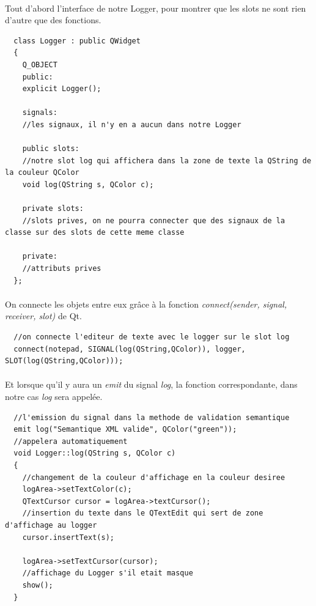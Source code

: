 \paragraph{}
Tout d'abord l'interface de notre Logger, pour montrer que les slots ne sont rien d'autre que des fonctions.
\begin{lstlisting}
  class Logger : public QWidget
  {
    Q_OBJECT
    public:
    explicit Logger();
    
    signals:
    //les signaux, il n'y en a aucun dans notre Logger
    
    public slots:
    //notre slot log qui affichera dans la zone de texte la QString de la couleur QColor
    void log(QString s, QColor c);

    private slots:
    //slots prives, on ne pourra connecter que des signaux de la classe sur des slots de cette meme classe

    private:
    //attributs prives
  };
\end{lstlisting}
\paragraph{}
On connecte les objets entre eux grâce à la fonction \textit{connect(sender, signal, receiver, slot)} de Qt.
\begin{lstlisting}
  //on connecte l'editeur de texte avec le logger sur le slot log
  connect(notepad, SIGNAL(log(QString,QColor)), logger, SLOT(log(QString,QColor)));
\end{lstlisting}
\paragraph{}
Et lorsque qu'il y aura un \textit{emit} du signal \textit{log}, la fonction correspondante, dans notre cas \textit{log} sera appelée.

\begin{lstlisting}
  //l'emission du signal dans la methode de validation semantique
  emit log("Semantique XML valide", QColor("green"));
  //appelera automatiquement
  void Logger::log(QString s, QColor c)
  {
    //changement de la couleur d'affichage en la couleur desiree
    logArea->setTextColor(c);
    QTextCursor cursor = logArea->textCursor();
    //insertion du texte dans le QTextEdit qui sert de zone d'affichage au logger
    cursor.insertText(s);

    logArea->setTextCursor(cursor);
    //affichage du Logger s'il etait masque
    show();
  }
\end{lstlisting}
